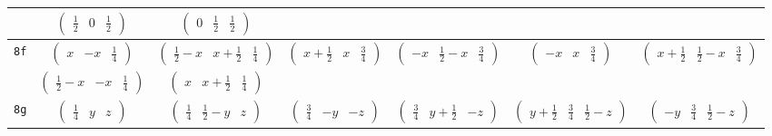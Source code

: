 \documentclass[fleqn,9pt,landscape]{jsarticle}
\begin{document}
\begin{center}
\begin{longtable}{ccccccc}
& $ \begin{pmatrix} \frac{1}{2} & 0 & \frac{1}{2} \end{pmatrix} $ & $ \begin{pmatrix} 0 & \frac{1}{2} & \frac{1}{2} \end{pmatrix} $ & $  $ & $  $ & $  $ & $  $ \\ \hline
{\tt 8f} & $ \begin{pmatrix} x & - x & \frac{1}{4} \end{pmatrix} $ & $ \begin{pmatrix} \frac{1}{2} - x & x + \frac{1}{2} & \frac{1}{4} \end{pmatrix} $ & $ \begin{pmatrix} x + \frac{1}{2} & x & \frac{3}{4} \end{pmatrix} $ & $ \begin{pmatrix} - x & \frac{1}{2} - x & \frac{3}{4} \end{pmatrix} $ & $ \begin{pmatrix} - x & x & \frac{3}{4} \end{pmatrix} $ & $ \begin{pmatrix} x + \frac{1}{2} & \frac{1}{2} - x & \frac{3}{4} \end{pmatrix} $ \\
& $ \begin{pmatrix} \frac{1}{2} - x & - x & \frac{1}{4} \end{pmatrix} $ & $ \begin{pmatrix} x & x + \frac{1}{2} & \frac{1}{4} \end{pmatrix} $ & $  $ & $  $ & $  $ & $  $ \\ \hline
{\tt 8g} & $ \begin{pmatrix} \frac{1}{4} & y & z \end{pmatrix} $ & $ \begin{pmatrix} \frac{1}{4} & \frac{1}{2} - y & z \end{pmatrix} $ & $ \begin{pmatrix} \frac{3}{4} & - y & - z \end{pmatrix} $ & $ \begin{pmatrix} \frac{3}{4} & y + \frac{1}{2} & - z \end{pmatrix} $ & $ \begin{pmatrix} y + \frac{1}{2} & \frac{3}{4} & \frac{1}{2} - z \end{pmatrix} $ & $ \begin{pmatrix} - y & \frac{3}{4} & \frac{1}{2} - z \end{pmatrix} $ \\

\end{longtable}
\end{center}
\end{document}
